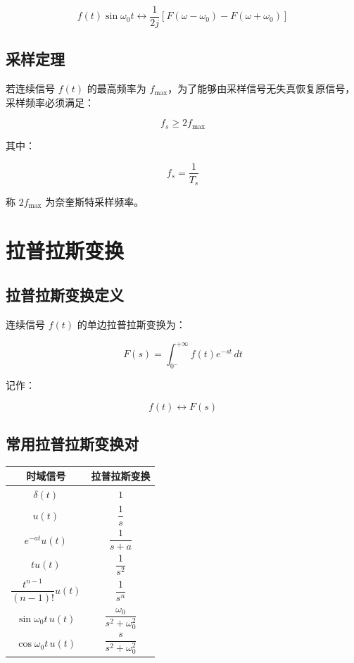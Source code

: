 \documentclass[UTF8]{ctexart}
\begin{document}
\[
f(t)\sin \omega_0 t
\leftrightarrow
\frac{1}{2j}\left[F(\omega-\omega_0)-F(\omega+\omega_0)\right]
\]

\subsection{采样定理}

若连续信号 $f(t)$ 的最高频率为 $f_{\max}$，为了能够由采样信号无失真恢复原信号，采样频率必须满足：

\[
f_s\geq 2f_{\max}
\]

其中：

\[
f_s=\frac{1}{T_s}
\]

称 $2f_{\max}$ 为奈奎斯特采样频率。

\section{拉普拉斯变换}

\subsection{拉普拉斯变换定义}

连续信号 $f(t)$ 的单边拉普拉斯变换为：

\[
F(s)=\int_{0^-}^{+\infty}f(t)e^{-st}\,dt
\]

记作：

\[
f(t)\leftrightarrow F(s)
\]

\subsection{常用拉普拉斯变换对}

\begin{table}[h]
\centering
\begin{tabular}{c c}
\toprule
时域信号 & 拉普拉斯变换 \\
\midrule
$\delta(t)$ & $1$ \\
$u(t)$ & $\dfrac{1}{s}$ \\
$e^{-at}u(t)$ & $\dfrac{1}{s+a}$ \\
$t u(t)$ & $\dfrac{1}{s^2}$ \\
$\dfrac{t^{n-1}}{(n-1)!}u(t)$ & $\dfrac{1}{s^n}$ \\
$\sin \omega_0 t\,u(t)$ & $\dfrac{\omega_0}{s^2+\omega_0^2}$ \\
$\cos \omega_0 t\,u(t)$ & $\dfrac{s}{s^2+\omega_0^2}$ \\
\bottomrule
\end{tabular}
\end{table}
\end{document}
